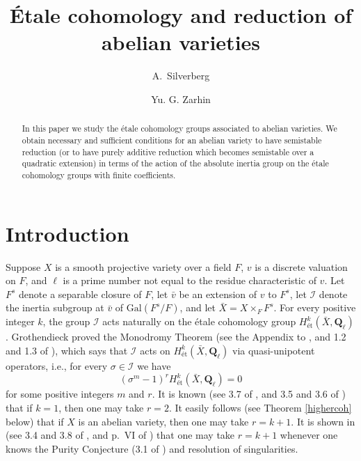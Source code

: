 \documentclass{amsart}
\title[\'Etale cohomology]
{\'Etale cohomology and reduction of abelian varieties}
\author[A.\ Silverberg]{A.\ Silverberg}
\author[Yu. G. Zarhin]{Yu. G. Zarhin}
\def\Q{{\mathbf Q}}
\def\Gal{\mathrm{Gal}}
\def\I{{\mathcal I}}
\theoremstyle{definition}
\begin{document}
\begin{abstract}
In this paper we study the \'etale cohomology groups
associated to abelian varieties. We obtain necessary
and sufficient conditions for an abelian variety to have
semistable reduction (or to have purely additive reduction
which becomes semistable over a quadratic extension) 
in terms of the action of the
absolute inertia group on the \'etale 
cohomology groups with finite coefficients.
\end{abstract}

\maketitle

\section{Introduction}
Suppose $X$ is a smooth projective variety over a field $F$,
$v$ is a discrete valuation on $F$, and $\ell$ is
a prime number not equal to the residue characteristic of $v$.
Let $F^s$ denote a separable closure of $F$, let ${\bar v}$
be an extension of $v$ to $F^s$, let $\I$ denote the
inertia subgroup at ${\bar v}$ of $\Gal(F^s/F)$, and let
${\bar X} = X\times_F F^s$. For every
positive integer $k$, the group $\I$ acts naturally
on the \'etale cohomology group 
$H^k_{\text{\'et}}({\bar X},\Q_\ell)$.
Grothendieck proved the Monodromy Theorem (see the Appendix to
\cite{SerreTate}, and 1.2 and 1.3 of
\cite{SGADeligne}), which says that $\I$ acts 
on $H^k_{\text{\'et}}({\bar X}, \Q_\ell)$ 
via quasi-unipotent operators, i.e.,
for every $\sigma\in\I$ we have 
$$(\sigma^m-1)^{r} H^k_{\text{\'et}}({\bar X},\Q_\ell)
=0$$
for some positive integers $m$ and $r$.
It is known (see 3.7 of \cite{SGADeligne}, and 
3.5 and 3.6 of \cite{SGA7}) 
that if $k=1$, then one may take $r=2$. 
It easily follows (see 
Theorem \ref{highercoh} below) that if 
$X$ is an abelian variety, then one may take $r=k+1$.
It is shown in \cite{SGA7I} (see 3.4 and 3.8 of \cite{SGADeligne},
and p.~VI of \cite{SGAintro})
that one may take $r=k+1$ whenever one knows the Purity
Conjecture (3.1 of \cite{SGADeligne}) and resolution of singularities.
\end{document}
